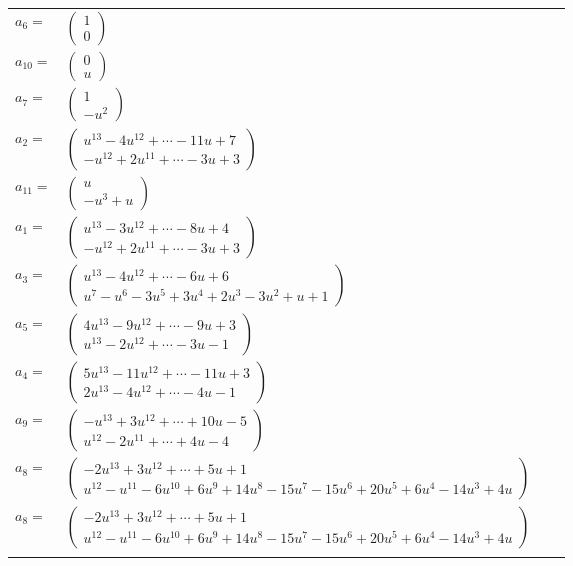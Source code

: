 \documentclass[1p]{elsarticle_modified}
\theoremstyle{definition}
\begin{document}
\begin{tabular}{m{7pt} m{180pt} m{7pt} m{180pt} }
\flushright $a_{6}=$&$\begin{pmatrix}1\\0\end{pmatrix}$ \\
\flushright $a_{10}=$&$\begin{pmatrix}0\\u\end{pmatrix}$ \\
\flushright $a_{7}=$&$\begin{pmatrix}1\\- u^2\end{pmatrix}$ \\
\flushright $a_{2}=$&$\begin{pmatrix}u^{13}-4 u^{12}+\cdots-11 u+7\\- u^{12}+2 u^{11}+\cdots-3 u+3\end{pmatrix}$ \\
\flushright $a_{11}=$&$\begin{pmatrix}u\\- u^3+u\end{pmatrix}$ \\
\flushright $a_{1}=$&$\begin{pmatrix}u^{13}-3 u^{12}+\cdots-8 u+4\\- u^{12}+2 u^{11}+\cdots-3 u+3\end{pmatrix}$ \\
\flushright $a_{3}=$&$\begin{pmatrix}u^{13}-4 u^{12}+\cdots-6 u+6\\u^7- u^6-3 u^5+3 u^4+2 u^3-3 u^2+u+1\end{pmatrix}$ \\
\flushright $a_{5}=$&$\begin{pmatrix}4 u^{13}-9 u^{12}+\cdots-9 u+3\\u^{13}-2 u^{12}+\cdots-3 u-1\end{pmatrix}$ \\
\flushright $a_{4}=$&$\begin{pmatrix}5 u^{13}-11 u^{12}+\cdots-11 u+3\\2 u^{13}-4 u^{12}+\cdots-4 u-1\end{pmatrix}$ \\
\flushright $a_{9}=$&$\begin{pmatrix}- u^{13}+3 u^{12}+\cdots+10 u-5\\u^{12}-2 u^{11}+\cdots+4 u-4\end{pmatrix}$ \\
\flushright $a_{8}=$&$\begin{pmatrix}-2 u^{13}+3 u^{12}+\cdots+5 u+1\\u^{12}- u^{11}-6 u^{10}+6 u^9+14 u^8-15 u^7-15 u^6+20 u^5+6 u^4-14 u^3+4 u\end{pmatrix}$\\ \flushright $a_{8}=$&$\begin{pmatrix}-2 u^{13}+3 u^{12}+\cdots+5 u+1\\u^{12}- u^{11}-6 u^{10}+6 u^9+14 u^8-15 u^7-15 u^6+20 u^5+6 u^4-14 u^3+4 u\end{pmatrix}$\\&\end{tabular}
\end{document}
